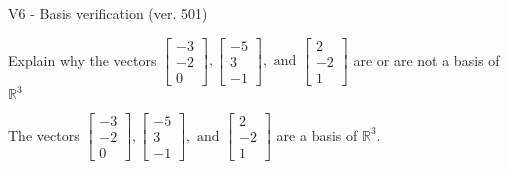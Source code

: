 \begin{exercise}
  \begin{exerciseTitle}V6 - Basis verification (ver. 501)\end{exerciseTitle}
  \begin{exerciseStatement}
    Explain why the vectors \(\left[\begin{array}{r}
-3 \\
-2 \\
0
\end{array}\right] , \left[\begin{array}{r}
-5 \\
3 \\
-1
\end{array}\right] , \text{ and } \left[\begin{array}{r}
2 \\
-2 \\
1
\end{array}\right]\) are or are not a basis of \(\mathbb{R}^3\)	


  \end{exerciseStatement}
  \begin{exerciseAnswer}
   The vectors \(\left[\begin{array}{r}
-3 \\
-2 \\
0
\end{array}\right] , \left[\begin{array}{r}
-5 \\
3 \\
-1
\end{array}\right] , \text{ and } \left[\begin{array}{r}
2 \\
-2 \\
1
\end{array}\right]\) 
  	 are  a basis of \(\mathbb{R}^3\).
  


  \end{exerciseAnswer}
\end{exercise}